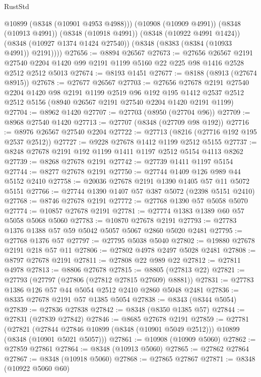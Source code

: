 \begin{lexlean}{RustStd}
\begin{coremodule}
          @10899
          (@8348 (@10901 @4953 @4988)))
        (@10908 (@10909 @4991))
        (@8348 (@10913 @4991))
        (@8348 (@10918 @4991))
        (@8348 (@10922 @4991 @1424))
        (@8348 (@10927 @1374 @1424 @27540))
        (@8348 (@8383 (@8384 (@10933 @4991)) @2191))))
@27656 := @8894 @26567
@27673 := @27656
    @26567
    @2191
    @27540
    @2204
    @1420
    @99
    @2191
    @1199
    @5160
    @22
    @225
    @98
    @1416
    @2528
    @2512
    @2512
    @5013
@27674 := @8193 @1451
@27677 := @8188 (@8913 (@27674 @8915))
@27678 := @27677 @26567
@27703 := @27656
    @27678
    @2191
    @27540
    @2204
    @1420
    @98
    @2191
    @1199
    @2519
    @96
    @192
    @195
    @1412
    @2537
    @2512
    @2512
    @5156
    (@8940 @26567 @2191 @27540 @2204 @1420 @2191 @1199)
@27704 := @8962 @1420
@27707 := @27703 (@8950 (@27704 @96))
@27709 := @8968 @27540 @1420
@27713 := @27707 (@8348 (@27709 @98 @192))
@27716 := @8976 @26567 @27540 @2204
@27722 := @27713 (@8216 (@27716 @192 @195 @2537 @2512))
@27727 := @9228 @27678 @1412 @1199 @2512 @5155
@27737 := @8248 @27678 @2191 @192 @1199 @1411 @1197 @2512 @5154 @4113 @8262
@27739 := @8268 @27678 @2191
@27742 := @27739 @1411 @1197 @5154
@27744 := @8277 @27678 @2191
@27750 := @27744 @1409 @126 @989 @44 @5152 @2410
@27758 := @20036 @27678 @2191 @1390 @1405 @57 @11 @5072 @5151
@27766 := @27744 @1390 @1407 @57 @387 @5072 (@2398 @5151 @2410)
@27768 := @8746 @27678 @2191
@27772 := @27768 @1390 @57 @5058 @5070
@27774 := @10857 @27678 @2191
@27781 := @27774 @1383 @1389 @60 @57 @5058 @5068 @5060
@27783 := @10870 @27678 @2191
@27793 := @27783 @1376 @1388 @57 @59 @5042 @5057 @5067 @2860 @5020 @2481
@27795 := @27768 @1376 @57
@27797 := @27795 @5038 @5040
@27802 := @19880 @27678 @2191 @218 @57 @11
@27806 := @27802 @4978 @2497 @5028 @2481
@27808 := @8797 @27678 @2191
@27811 := @27808 @22 @989 @22
@27812 := @27811 @4978
@27813 := @8806 @27678
@27815 := @8805 (@27813 @22)
@27821 := @27793 (@27797 (@27806 (@27812 @27815 @27609) @8881))
@27831 := @27783 @1386 @126 @57 @44 @5054 @2512 @2410 @2860 @5048 @2481
@27836 := @8335 @27678 @2191 @57 @1385 @5054
@27838 := @8343 (@8344 @5054)
@27839 := @27836 @27838
@27842 := @8348 (@8350 @1385 @57)
@27844 := @27831 (@27839 @27842)
@27846 := @8685 @27678 @2191
@27859 := @27781
    (@27821 (@27844 @27846 @10899 (@8348 (@10901 @5049 @2512))) @10899 (@8348 (@10901 @5021 @5057)))
@27861 := @10908 (@10909 @5060)
@27862 := @27859 @27861
@27864 := @8348 (@10913 @5060)
@27865 := @27862 @27864
@27867 := @8348 (@10918 @5060)
@27868 := @27865 @27867
@27871 := @8348 (@10922 @5060 @60)

\end{coremodule}
\end{lexlean}
